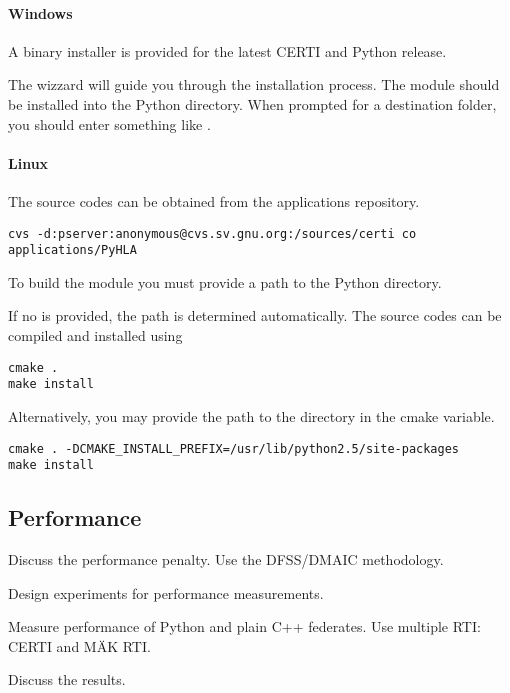 \documentclass[12pt,a4paper]{howto}
\begin{document}
\paragraph{Windows}

A binary installer is provided for the latest CERTI and Python release.

The wizzard will guide you through the installation process. The 
module should be installed into the Python  directory.
When prompted for a destination folder, you should enter something like
.

\paragraph{Linux}

The  source codes can be obtained from the 
applications repository.
\begin{verbatim}
cvs -d:pserver:anonymous@cvs.sv.gnu.org:/sources/certi co applications/PyHLA
\end{verbatim}

To build the  module you must provide a path to the Python
 directory.

If no  is provided, the path is determined
automatically. The source codes can be compiled and installed using
\begin{verbatim}
cmake .
make install
\end{verbatim}

Alternatively, you may provide the path to the  directory
in the  cmake variable.
\begin{verbatim}
cmake . -DCMAKE_INSTALL_PREFIX=/usr/lib/python2.5/site-packages
make install
\end{verbatim}

\subsection{Performance}

Discuss the performance penalty. Use the DFSS/DMAIC methodology.

Design experiments for performance measurements.

Measure performance of Python and plain C++ federates. Use multiple RTI: CERTI and MÄK RTI.

Discuss the results.





\end{document}
